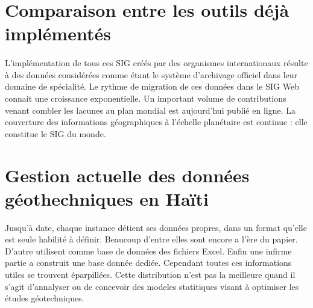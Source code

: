     \section{Comparaison entre les outils déjà implémentés}
    \paragraph{}
    L’implémentation de tous ces SIG créés par des organismes internationaux résulte à des données considérées 
    comme étant le système d’archivage officiel dans leur domaine de spécialité.
     Le rythme de migration de ces données dans le SIG Web connait une croissance exponentielle. 
     Un important volume de contributions venant combler les lacunes au plan mondial est aujourd’hui publié en ligne.
      La couverture des informations géographiques à l’échelle planétaire est continue : elle constitue le SIG du monde.
    \section{Gestion actuelle des données géothechniques en Haïti}
    Jusqu’à date, chaque instance détient ses données propres, dans un format qu’elle est seule habilité à définir. Beaucoup d’entre elles sont encore a l’ère du papier. D’autre utilisent comme base de données des fichiers Excel. Enfin une infirme partie a construit une base donnée dediée. Cependant toutes ces informations utiles  se trouvent éparpillées. Cette distribution n’est pas la meilleure quand il s’agit d’annalyser ou de concevoir des modeles statitiques  visant à optimiser les études géotechniques.

